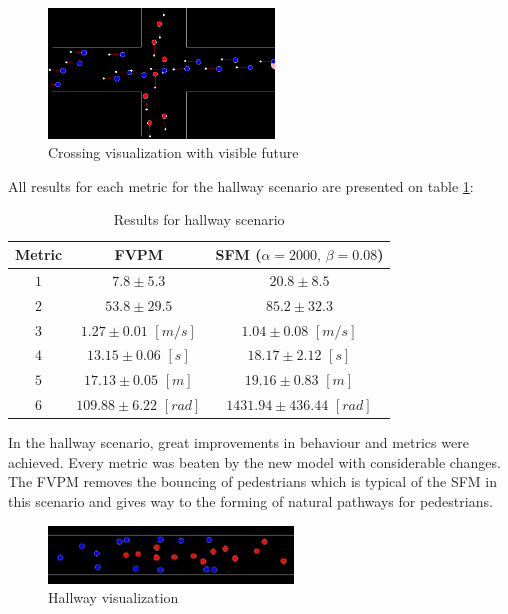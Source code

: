 \documentclass[english]{article}
\providecommand{\tabularnewline}{\\}
\begin{document}
    \begin{figure}[H]
        \centering{} \includegraphics[width=6cm]{pics/program/crossing-future}
        \caption{\label{fig:crossing-future}Crossing visualization with visible future}
    \end{figure}
    
    \vspace{1cm}
    All results for each metric for the hallway scenario are presented on table \ref{table:metric-hallway}:
    \begin{table}[H]
        \begin{centering}
			\begin{tabular}{|c|c|c|}
				\hline 
				Metric  & {\scriptsize{FVPM}} & {\scriptsize{SFM ($\alpha=2000,\,\beta=0.08$)}}\tabularnewline
				\hline 
				\hline 
				$1$  & {\scriptsize{$7.8\pm5.3$}} & {\scriptsize{$20.8\pm8.5$}}\tabularnewline
				\hline 
				$2$  & {\scriptsize{$53.8\pm29.5$}} & {\scriptsize{$85.2\pm32.3$}}\tabularnewline
				\hline 
				$3$  & {\scriptsize{$1.27\pm0.01$ $[m/s]$}} & {\scriptsize{$1.04\pm0.08$ $[m/s]$}}\tabularnewline
				\hline 
				$4$  & {\scriptsize{$13.15\pm0.06$ $[s]$}} & {\scriptsize{$18.17\pm2.12$ $[s]$}}\tabularnewline
				\hline 
				$5$  & {\scriptsize{$17.13\pm0.05$ $[m]$}} & {\scriptsize{$19.16\pm0.83$ $[m]$}}\tabularnewline
				\hline 
				$6$  & {\scriptsize{$109.88\pm6.22$ $[rad]$}} & {\scriptsize{$1431.94\pm436.44$ $[rad]$}}\tabularnewline
				\hline 
			\end{tabular}
        \par\end{centering}
        \caption{Results for hallway scenario \label{table:metric-hallway}}
    \end{table}

    In the hallway scenario, great improvements in behaviour and metrics were achieved.
    Every metric was beaten by the new model with considerable changes. The FVPM
    removes the bouncing of pedestrians which is typical of the SFM in this
    scenario and gives way to the forming of natural pathways for pedestrians.
    
    \begin{figure}[H]
        \begin{centering}
        \includegraphics[width=6.5cm]{pics/program/hallway-no-future} 
        \par\end{centering}
        
        \caption{\label{fig:hallway-no-future}Hallway visualization}
    \end{figure}
\end{document}

